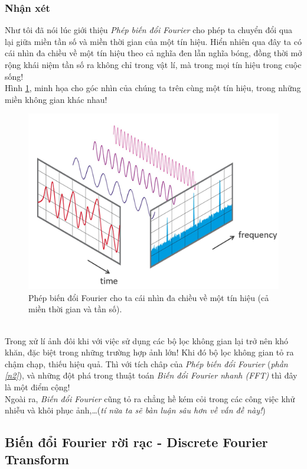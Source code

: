 \documentclass{article}
\begin{document}
        \subsubsection*{Nhận xét}
        Như tôi đã nói lúc giới thiệu \textit{Phép biến đổi Fourier} cho phép ta chuyển đổi qua lại giữa miền tần số và miền thời gian của một tín hiệu. Hiển nhiên qua đây ta có cái nhìn đa chiều về một tín hiệu theo cả nghĩa đen lẫn nghĩa bóng, đồng thời mở rộng khái niệm tần số ra không chỉ trong vật lí, mà trong mọi tín hiệu trong cuộc sống! \\Hình \ref{fig4}, minh họa cho góc nhìn của chúng ta trên cùng một tín hiệu, trong những miền không gian khác nhau!
        \begin{figure}[ht!]
        \centering
        \includegraphics[width = 0.7\linewidth]{fo2.png}
        \caption{Phép biến đổi Fourier cho ta cái nhìn đa chiều về một tín hiệu (cả miền thời gian và tần số).}
        \label{fig4}
        \end{figure}
        \\
        Trong xử lí ảnh đôi khi với việc sử dụng các bộ lọc không gian lại trở nên khó khăn, đặc biệt trong những trường hợp ảnh lớn! Khi đó bộ lọc không gian tỏ ra chậm chạp, thiếu hiệu quả. Thì với tích châp của \textit{Phép biến đổi Fourier} (\textit{phần \ref{n2}}), và những đột phá trong thuật toán \textit{Biến đổi Fourier nhanh (FFT)} thì đây là một điểm cộng!\\
        Ngoài ra, \textit{Biến đổi Fourier} cũng tỏ ra chẳng hề kém cỏi trong các công việc khử nhiễu và khôi phục ảnh,\ldots (\textit{tí nữa ta sẽ bàn luận sâu hơn về vấn đề này!})
        
        \subsection{Biến đổi Fourier rời rạc - Discrete Fourier Transform}
\end{document}
